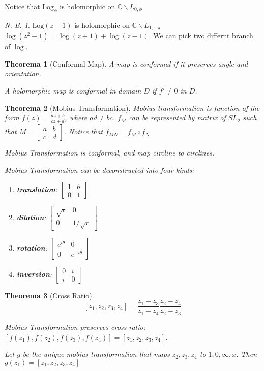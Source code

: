 \documentclass[12pt, a4paper]{article}
\newtheorem{theorem}{Theorema}[section]
\theoremstyle{definition}
\theoremstyle{remark}
\newtheorem{note}{N. B.}[section]
\newcommand{\bb}[1]{\mathbb{#1}}
\newcommand{\Log}{\text{Log}}
\renewcommand{\emph}[1]{\textbf{\textit{#1}}}
\begin{document}
Notice that $\Log_{\phi}$ is holomorphic on $\bb{C} \backslash L_{0, \phi} $

\begin{note} 
	$\Log(z-1)$ is holomorphic on $\bb{C} \backslash L_{1, -\pi}$
	$\log(z^2 - 1) = \log(z+1) + \log(z-1)$. We can pick two differnt branch of $\log$.
\end{note}

\begin{theorem}[Conformal Map]
	A map is conformal if it preserves angle and orientation. 

	A holomorphic map is conformal in domain $D$ if $f' \neq 0$ in  $D$.
\end{theorem}

\begin{theorem}[Mobius Transformation]
	Mobius transformation is function of the form $f(z) = \frac{az + b}{cz + d}$, where $ad \neq bc$. 
	$f_M$ can be represented by matrix of $SL_2$ such that $M = \begin{bmatrix} a & b \\ c & d\end{bmatrix} $. Notice that $f_{MN}= f_M \circ f_N$

	Mobius Transformation is conformal, and map circline to circlines.
	
	Mobius Transformation can be deconstructed into four kinds: 
	\begin{enumerate}
		\item \emph{translation}: $\begin{bmatrix} 1 & b \\ 0 & 1\end{bmatrix}$
		\item \emph{dilation}: $\begin{bmatrix} \sqrt{r} & 0 \\ 0 & 1/\sqrt{r}\end{bmatrix}$
		\item \emph{rotation}: $\begin{bmatrix} e^{i\theta} & 0 \\ 0 & e^{-i\theta}\end{bmatrix}$
		\item \emph{inversion}: $\begin{bmatrix} 0 & i \\ i & 0\end{bmatrix}$
	\end{enumerate}
\end{theorem}

\begin{theorem}[Cross Ratio]
$$
[z_1, z_2, z_3, z_4] = \frac{z_1 - z_3}{z_1 - z_4} \frac{z_2 - z_4}{z_2 - z_3}
$$

Mobius Transformation preserves cross ratio: $[f(z_1), f(z_2), f(z_3), f(z_4)] = [z_1, z_2, z_3, z_4]$. 

Let $g$ be the unique mobius transformation that maps $z_2, z_3, z_4$ to $1, 0, \infty, x$. Then $g(z_1) = [z_1, z_2, z_3, z_4]$
\end{theorem}
\end{document}
